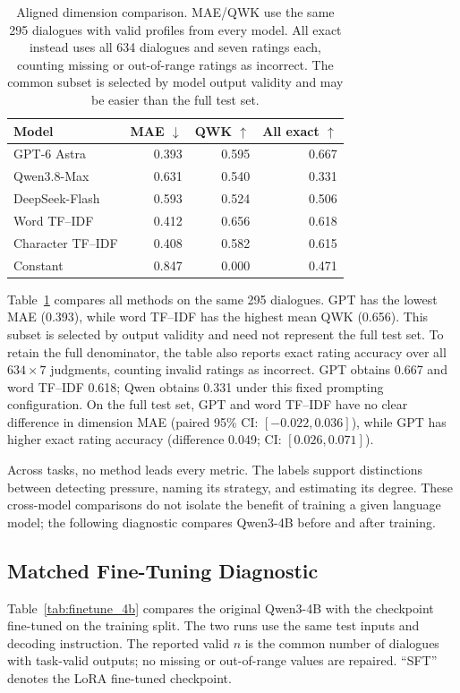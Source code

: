 \documentclass[11pt]{article}
\begin{document}
\begin{table}[t]
\centering\small
\setlength{\tabcolsep}{3pt}
\begin{tabular}{@{}lrrr@{}}
\toprule
Model & MAE $\downarrow$ & QWK $\uparrow$ & All exact $\uparrow$\\
\midrule
GPT-6 Astra & 0.393 & 0.595 & 0.667\\
Qwen3.8-Max & 0.631 & 0.540 & 0.331\\
DeepSeek-Flash & 0.593 & 0.524 & 0.506\\
Word TF--IDF & 0.412 & 0.656 & 0.618\\
Character TF--IDF & 0.408 & 0.582 & 0.615\\
Constant & 0.847 & 0.000 & 0.471\\
\bottomrule
\end{tabular}
\caption{Aligned dimension comparison. MAE/QWK use the same 295 dialogues with valid profiles from every model. All exact instead uses all 634 dialogues and seven ratings each, counting missing or out-of-range ratings as incorrect. The common subset is selected by model output validity and may be easier than the full test set.}
\label{tab:common_dimensions}
\end{table}

Table~\ref{tab:common_dimensions} compares all methods on the same 295
dialogues. GPT has the lowest MAE (0.393), while word TF--IDF has the highest
mean QWK (0.656). This subset is selected by output validity and need not
represent the full test set. To retain the full denominator, the table also
reports exact rating accuracy over all $634\times7$ judgments, counting
invalid ratings as incorrect. GPT obtains 0.667 and word TF--IDF 0.618;
Qwen obtains 0.331 under this fixed prompting configuration.
On the full test set, GPT and word TF--IDF have no clear difference in
dimension MAE (paired 95\% CI: $[-0.022, 0.036]$), while GPT has higher
exact rating accuracy (difference 0.049; CI: $[0.026, 0.071]$).

Across tasks, no method leads every metric. The labels support distinctions
between detecting pressure, naming its strategy, and estimating its degree.
These cross-model comparisons do not isolate the benefit of training a given
language model; the following diagnostic compares Qwen3-4B before and after training.

\subsection{Matched Fine-Tuning Diagnostic}
Table~\ref{tab:finetune_4b} compares the original Qwen3-4B with the
checkpoint fine-tuned on the training split. The two runs use the same test
inputs and decoding instruction. The reported valid $n$ is the common number
of dialogues with task-valid outputs; no missing or out-of-range values are
repaired. ``SFT'' denotes the LoRA fine-tuned checkpoint.
\end{document}
